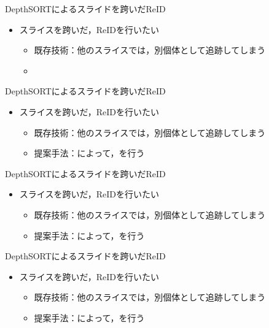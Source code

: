 \begin{frame}{DepthSORTによるスライドを跨いだReID}
    \begin{itemize}
        \item スライスを跨いだ，ReIDを行いたい
        \begin{itemize}
            \item 既存技術：他のスライスでは，別個体として追跡してしまう
            \item[\phantom{}] 
        \end{itemize}
    \end{itemize}
\end{frame}
\begin{frame}[noframenumbering]{DepthSORTによるスライドを跨いだReID}
    \begin{itemize}
        \item スライスを跨いだ，ReIDを行いたい
        \begin{itemize}
            \item 既存技術：他のスライスでは，別個体として追跡してしまう
            \item[\red{$\blacktriangleright$}] 提案手法：によって，を行う
        \end{itemize}
    \end{itemize}
\end{frame}
\begin{frame}[noframenumbering]{DepthSORTによるスライドを跨いだReID}
    \begin{itemize}
        \item スライスを跨いだ，ReIDを行いたい
        \begin{itemize}
            \item 既存技術：他のスライスでは，別個体として追跡してしまう
            \item[\red{$\blacktriangleright$}] 提案手法：によって，を行う
        \end{itemize}
    \end{itemize}
\end{frame}
\begin{frame}[noframenumbering]{DepthSORTによるスライドを跨いだReID}
    \begin{itemize}
        \item スライスを跨いだ，ReIDを行いたい
        \begin{itemize}
            \item 既存技術：他のスライスでは，別個体として追跡してしまう
            \item[\red{$\blacktriangleright$}] 提案手法：によって，を行う
        \end{itemize}
    \end{itemize}
\end{frame}
